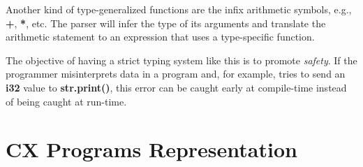 \documentclass[11pt,fleqn,openany]{book} %
\begin{document}
Another kind of type-generalized functions are the infix arithmetic symbols, e.g., \textbf{+}, \textbf{*}, etc. The parser will infer the type of its arguments and translate the arithmetic statement to an expression that uses a type-specific function.

The objective of having a strict typing system like this is to promote \emph{safety}. If the programmer misinterprets data in a program and, for example, tries to send an \textbf{i32} value to \textbf{str.print()}, this error can be caught early at compile-time instead of being caught at run-time.



\chapter{CX Programs Representation}
\label{chapter:cx-programs-representation}

\end{document}
